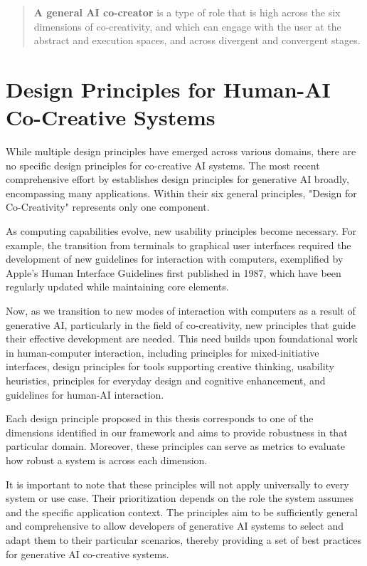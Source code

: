 \begin{quote}
    \textbf{A general AI co-creator} is a type of role that is high across the six dimensions of co-creativity, and which can engage with the user at the abstract and execution spaces, and across divergent and convergent stages. 
\end{quote}




\section{Design Principles for Human-AI Co-Creative Systems}

While multiple design principles have emerged across various domains, there are no specific design principles for co-creative AI systems. The most recent comprehensive effort by \cite{Weisz2024-io} establishes design principles for generative AI broadly, encompassing many applications. Within their six general principles, "Design for Co-Creativity" represents only one component.

As computing capabilities evolve, new usability principles become necessary. For example, the transition from terminals to graphical user interfaces required the development of new guidelines for interaction with computers, exemplified by Apple's Human Interface Guidelines first published in 1987, which have been regularly updated while maintaining core elements.

Now, as we transition to new modes of interaction with computers as a result of generative AI, particularly in the field of co-creativity, new principles that guide their effective development are needed. This need builds upon foundational work in human-computer interaction, including \cite{Horvitz1999-wh} principles for mixed-initiative interfaces, \cite{Resnick2005-fs} design principles for tools supporting creative thinking, \cite{Nielsen1994-df} usability heuristics, \cite{Norman2013-hs, Norman1994-kz} principles for everyday design and cognitive enhancement, and \cite{Amershi2019-vy} guidelines for human-AI interaction.

Each design principle proposed in this thesis corresponds to one of the dimensions identified in our framework and aims to provide robustness in that particular domain. Moreover, these principles can serve as metrics to evaluate how robust a system is across each dimension.

It is important to note that these principles will not apply universally to every system or use case. Their prioritization depends on the role the system assumes and the specific application context. The principles aim to be sufficiently general and comprehensive to allow developers of generative AI systems to select and adapt them to their particular scenarios, thereby providing a set of best practices for generative AI co-creative systems.



